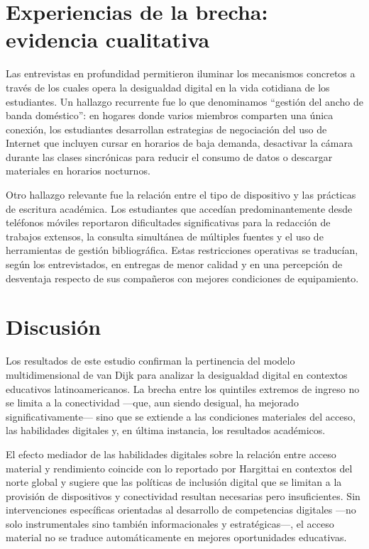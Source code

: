 \documentclass{article}
\begin{document}
\section{Experiencias de la brecha: evidencia cualitativa}
Las entrevistas en profundidad permitieron iluminar los mecanismos concretos a través de los cuales opera la desigualdad digital en la vida cotidiana de los estudiantes. Un hallazgo recurrente fue lo que denominamos “gestión del ancho de banda doméstico”: en hogares donde varios miembros comparten una única conexión, los estudiantes desarrollan estrategias de negociación del uso de Internet que incluyen cursar en horarios de baja demanda, desactivar la cámara durante las clases sincrónicas para reducir el consumo de datos o descargar materiales en horarios nocturnos.

Otro hallazgo relevante fue la relación entre el tipo de dispositivo y las prácticas de escritura académica. Los estudiantes que accedían predominantemente desde teléfonos móviles reportaron dificultades significativas para la redacción de trabajos extensos, la consulta simultánea de múltiples fuentes y el uso de herramientas de gestión bibliográfica. Estas restricciones operativas se traducían, según los entrevistados, en entregas de menor calidad y en una percepción de desventaja respecto de sus compañeros con mejores condiciones de equipamiento.


\section{Discusión}
Los resultados de este estudio confirman la pertinencia del modelo multidimensional de van Dijk \autocite{2563-VANDIJK2020} para analizar la desigualdad digital en contextos educativos latinoamericanos. La brecha entre los quintiles extremos de ingreso no se limita a la conectividad —que, aun siendo desigual, ha mejorado significativamente— sino que se extiende a las condiciones materiales del acceso, las habilidades digitales y, en última instancia, los resultados académicos.

El efecto mediador de las habilidades digitales sobre la relación entre acceso material y rendimiento coincide con lo reportado por Hargittai \autocite{2565-HARGITTAI2002} en contextos del norte global y sugiere que las políticas de inclusión digital que se limitan a la provisión de dispositivos y conectividad resultan necesarias pero insuficientes. Sin intervenciones específicas orientadas al desarrollo de competencias digitales —no solo instrumentales sino también informacionales y estratégicas—, el acceso material no se traduce automáticamente en mejores oportunidades educativas.
\end{document}
